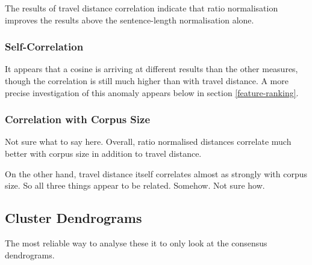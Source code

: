 The results of travel distance correlation indicate that ratio
normalisation improves the results above the sentence-length
normalisation alone.

\subsubsection{Self-Correlation}

It appears that a cosine is arriving at different results than the
other measures, though the correlation is still much higher than with
travel distance. A more precise investigation of this anomaly appears
below in section \ref{feature-ranking}.

\subsubsection{Correlation with Corpus Size}

Not sure what to say here. Overall, ratio normalised distances correlate much
better with corpus size in addition to travel distance.

On the other hand, travel distance itself correlates almost as
strongly with corpus size. So all three things appear to be
related. Somehow. Not sure how.

\subsection{Cluster Dendrograms}

The most reliable way to analyse these it to only look at the
consensus dendrograms.






